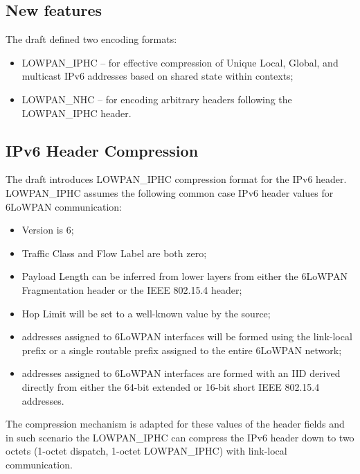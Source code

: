 \documentclass[a4paper,11pt,oneside]{article}
\begin{document}
\subsection{New features} 
The draft defined two encoding formats:
\begin{itemize}
\item LOWPAN\_IPHC -- for effective compression of Unique Local, Global, and multicast IPv6
addresses based on shared state within contexts;

\item LOWPAN\_NHC -- for encoding arbitrary headers following the LOWPAN\_IPHC header.
\end{itemize}

\subsection{IPv6 Header Compression} 
The draft \cite{draft-hc-06} introduces LOWPAN\_IPHC compression format for the IPv6 header. LOWPAN\_IPHC assumes the following common case IPv6 header values for 6LoWPAN communication:
\begin{itemize}
\item Version is 6; 
\item Traffic Class and Flow Label are both zero; 
\item Payload Length can be inferred from lower layers from either the 6LoWPAN Fragmentation header or the IEEE 802.15.4 header;
\item Hop Limit will be set to a well-known value by the source; 
\item addresses assigned to 6LoWPAN interfaces will be formed using the link-local prefix or a single routable prefix assigned to the entire 6LoWPAN network; 
\item addresses assigned to 6LoWPAN interfaces are formed with an IID derived directly from either the 64-bit extended or 16-bit short IEEE 802.15.4 addresses.
\end{itemize}

The compression mechanism is adapted for these values of the header fields and  in such scenario the LOWPAN\_IPHC can compress the IPv6 header down to two octets (1-octet dispatch, 1-octet LOWPAN\_IPHC) with link-local communication.
\end{document}
